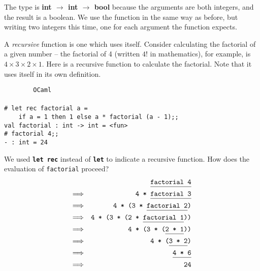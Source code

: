 \documentclass[]{book}
\newcommand{\smspace}{\vspace{4mm}}
\begin{document}
\noindent The type is \textsf{\textbf{int $\rightarrow$ int $\rightarrow$ bool}} because the arguments are both integers, and the result is a boolean. We use the function in the same way as before, but writing two integers this time, one for each argument the function expects.

A \textit{recursive} function is one which uses itself. Consider calculating the factorial of a given number -- the factorial of 4 (written $4!$ in mathematics), for example, is $4\times3\times2\times1$. Here is a recursive function to calculate the factorial. Note that it uses itself in its own definition.

\smspace
\noindent\verb!        OCaml!\\
\noindent\\
\noindent\verb!# let rec factorial a =!\\
\noindent\verb!    if a = 1 then 1 else a * factorial (a - 1);;!\\
\noindent\verb!val factorial : int -> int = <fun>!\\
\noindent\texttt{\# factorial 4;;}\\
\noindent\verb!- : int = 24!
\smspace

\noindent We used \textbf{\texttt{let\!\! rec}} instead of \textbf{\texttt{let}} to indicate a recursive function.  How does the evaluation of \texttt{factorial} proceed?
\begin{eqnarray*}
 & & \texttt{\underline{\vphantom{g}factorial 4}} \\
 \Longrightarrow & & \texttt{4 * \underline{\vphantom{g}factorial 3}} \\
 \Longrightarrow & & \texttt{4 * (3 * \underline{\vphantom{g}factorial 2})} \\
 \Longrightarrow & & \texttt{4 * (3 * (2 * \underline{\vphantom{g}factorial 1}))}\\
 \Longrightarrow & & \texttt{4 * (3 * (\underline{\vphantom{g}2 * 1}))}\\
 \Longrightarrow & & \texttt{4 * (\underline{\vphantom{g}3 * 2})}\\
 \Longrightarrow & & \texttt{\underline{\vphantom{g}4 * 6}} \\
 \Longrightarrow & & \verb!24!
\end{eqnarray*}
\end{document}
